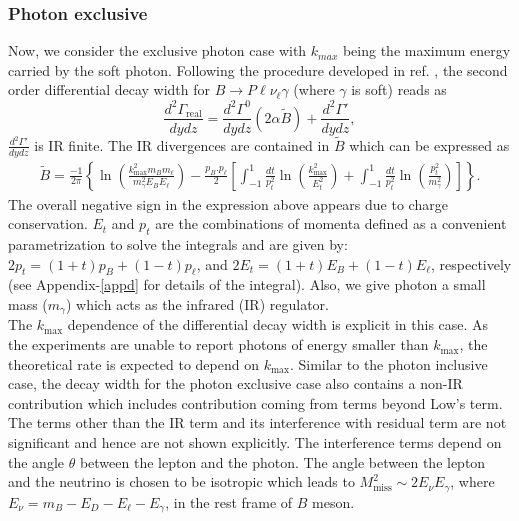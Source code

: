 \documentclass[a4paper,11pt]{article}
\begin{document}
		\subsubsection{Photon exclusive}
    	Now, we consider the exclusive photon case with $k_{max}$ being the maximum energy carried by the soft photon. Following the procedure developed in ref. \cite{Mishra:2020orb}, the second order differential decay width for $B\rightarrow P \ell \nu_\ell \gamma$ (where $\gamma$ is soft) reads as
		\begin{equation}
		\frac{d^{2}\Gamma_{\text{real}}}{dy dz} = \frac{d^{2}\Gamma^{0}}{dy dz}(2 \alpha \tilde{B})  + \frac{d^{2}\Gamma'}{dy dz},
		\label{dr}
		\end{equation}	
		$\frac{d^{2}\Gamma'}{dy dz}$ is IR finite. The IR divergences are contained in $\tilde{B}$ which can be expressed as
		\begin{align}
		\tilde{B}=\frac{-1}{2\pi}\left\lbrace \ln\left( \frac{k_{\text{max}}^{2}m_{B}m_{\ell}}{m_{\gamma}^{2}E_{B}E_{\ell}}\right)-\frac{p_{B}.p_{\ell}}{2}\left[ \int_{-1}^{1}\frac{dt}{p_{t}^{2}}\ln\left(\frac{k_{\text{max}}^{2}}{E_{t}^{2}} \right)+\int_{-1}^{1}\frac{dt}{p_{t}^{2}}\ln\left(\frac{p_{t}^{2}}{m_{\gamma}^{2}} \right) \right]  \right\rbrace.
		\end{align} 
		The overall negative sign in the expression above appears due to charge conservation. $E_t$ and $p_t$ are the combinations of momenta defined as a convenient parametrization to solve the integrals and are given by: $ 
		  2p_{t} = (1+t)p_{B}+(1-t)p_{\ell}$, and 
		   $2E_{t}=(1+t)E_{B}+(1-t)E_{\ell}$, respectively (see Appendix-\ref{appd} for details of the integral). Also, we give photon a small mass ($m_{\gamma}$) which acts as the infrared (IR) regulator.\\
		The $k_{\text{max}}$ dependence of the differential decay width is explicit in this case. As the experiments are unable to report photons of energy smaller than $k_{\text{max}}$, the theoretical rate is expected to depend on $k_{\text{max}}$. Similar to the photon inclusive case, the decay width for the photon exclusive case also contains a non-IR contribution which includes contribution coming from terms beyond Low's term. The terms other than the IR term and its interference with residual term are not significant and hence are not shown explicitly. The interference terms depend on the angle $\theta$ between the lepton and the photon. The angle between the lepton and the neutrino is chosen to be isotropic which leads to $M_{\text{miss}}^2\sim 2E_{\nu}E_\gamma$, where $E_{\nu}=m_B-E_D-E_{\ell}-E_{\gamma}$, in the rest frame of $B$ meson.
\end{document}
